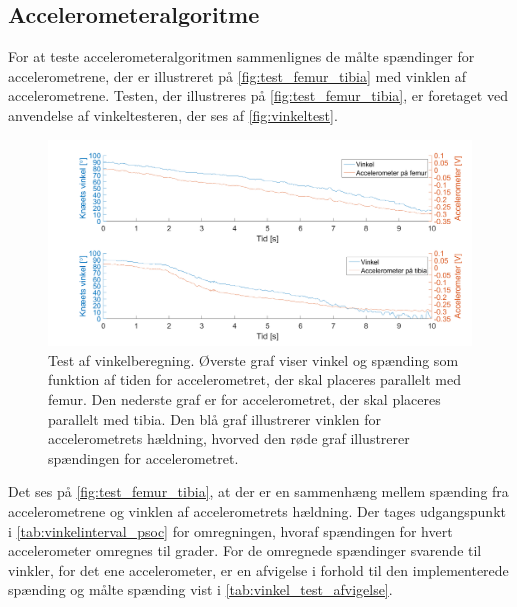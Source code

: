 \subsection{Accelerometeralgoritme}
For at teste accelerometeralgoritmen sammenlignes de målte spændinger for accelerometrene, der er illustreret på \autoref{fig:test_femur_tibia} med vinklen af accelerometrene.
Testen, der illustreres på \autoref{fig:test_femur_tibia}, er foretaget ved anvendelse af vinkeltesteren, der ses af \autoref{fig:vinkeltest}.  

\begin{figure}[H]
\centering
\includegraphics[width=1\textwidth]{figures/vinkel_tibia_femur}
\caption{Test af vinkelberegning. Øverste graf viser vinkel og spænding som funktion af tiden for accelerometret, der skal placeres parallelt med femur. Den nederste graf er for accelerometret, der skal placeres parallelt med tibia. Den blå graf illustrerer vinklen for accelerometrets hældning, hvorved den røde graf illustrerer spændingen for accelerometret.}
\label{fig:test_femur_tibia}
\end{figure}

\noindent
Det ses på \autoref{fig:test_femur_tibia}, at der er en sammenhæng mellem spænding fra accelerometrene og vinklen af accelerometrets hældning. 
Der tages udgangspunkt i \autoref{tab:vinkelinterval_psoc} for omregningen, hvoraf spændingen for hvert accelerometer omregnes til grader. For de omregnede spændinger svarende til vinkler, for det ene accelerometer, er en afvigelse i forhold til den implementerede spænding og målte spænding vist i \autoref{tab:vinkel_test_afvigelse}.

